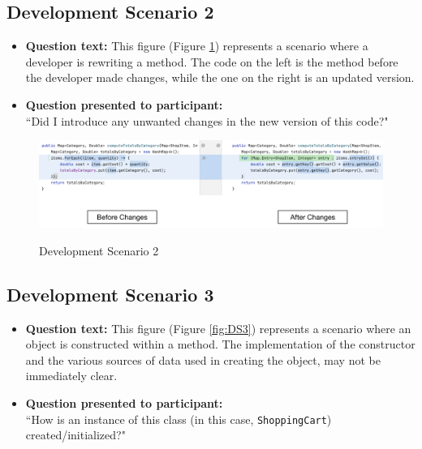 \subsection{Development Scenario 2}

\begin{itemize}
  \item[] \textbf{Question text:} This figure (Figure \ref{fig:DS2}) represents 
          a scenario where a developer is rewriting a method. The code on the 
          left is the method before the developer made changes, while the one 
          on the right is an updated version.
  \item[] \textbf{Question presented to participant:}  \\
         ``Did I introduce any unwanted changes in the new version of this 
           code?"
\end{itemize}

\begin{figure}[ht]
\centering
\caption{Development Scenario 2}
\includegraphics[width=\textwidth]{./figs/ds2.png}
\label{fig:DS2}
\end{figure}

\subsection{Development Scenario 3}

\begin{itemize}
  \item[] \textbf{Question text:} This figure (Figure \ref{fig:DS3}) represents 
          a scenario where an object is constructed within a method. The 
          implementation of the constructor and the various sources of data 
          used in creating the object, may not be immediately clear.
  \item[] \textbf{Question presented to participant:}  \\
          ``How is an instance of this class (in this case, 
           \texttt{ShoppingCart}) created/initialized?"
\end{itemize}

